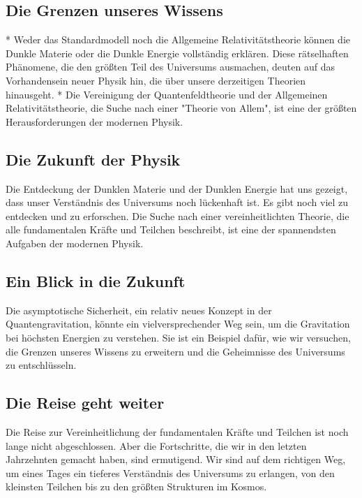 \documentclass{article}
\begin{document}
\subsection{Die Grenzen unseres Wissens}

*   Weder das Standardmodell noch die Allgemeine Relativitätstheorie können die Dunkle Materie oder die Dunkle Energie vollständig erklären. Diese rätselhaften Phänomene, die den größten Teil des Universums ausmachen, deuten auf das Vorhandensein neuer Physik hin, die über unsere derzeitigen Theorien hinausgeht.
*   Die Vereinigung der Quantenfeldtheorie und der Allgemeinen Relativitätstheorie, die Suche nach einer "Theorie von Allem", ist eine der größten Herausforderungen der modernen Physik.

\subsection{Die Zukunft der Physik}

Die Entdeckung der Dunklen Materie und der Dunklen Energie hat uns gezeigt, dass unser Verständnis des Universums noch lückenhaft ist. Es gibt noch viel zu entdecken und zu erforschen. Die Suche nach einer vereinheitlichten Theorie, die alle fundamentalen Kräfte und Teilchen beschreibt, ist eine der spannendsten Aufgaben der modernen Physik.

\subsection{Ein Blick in die Zukunft}

Die asymptotische Sicherheit, ein relativ neues Konzept in der Quantengravitation, könnte ein vielversprechender Weg sein, um die Gravitation bei höchsten Energien zu verstehen. Sie ist ein Beispiel dafür, wie wir versuchen, die Grenzen unseres Wissens zu erweitern und die Geheimnisse des Universums zu entschlüsseln.

\subsection{Die Reise geht weiter}

Die Reise zur Vereinheitlichung der fundamentalen Kräfte und Teilchen ist noch lange nicht abgeschlossen. Aber die Fortschritte, die wir in den letzten Jahrzehnten gemacht haben, sind ermutigend. Wir sind auf dem richtigen Weg, um eines Tages ein tieferes Verständnis des Universums zu erlangen, von den kleinsten Teilchen bis zu den größten Strukturen im Kosmos.
\end{document}
